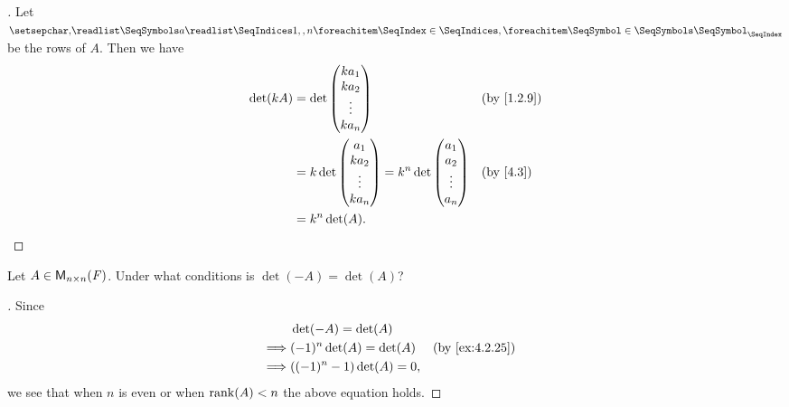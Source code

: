 \begin{proof}[]
  Let \(\seq{a}{1,,n}\) be the rows of \(A\).
  Then we have
  \begin{align*}
    \det(kA) & = \det\begin{pmatrix}
                       k a_1  \\
                       k a_2  \\
                       \vdots \\
                       k a_n
                     \end{pmatrix}                   &  & \text{(by \cref{1.2.9})}       \\
             & = k \det\begin{pmatrix}
                         a_1    \\
                         k a_2  \\
                         \vdots \\
                         k a_n
                       \end{pmatrix} = k^n \det\begin{pmatrix}
                                                 a_1    \\
                                                 a_2    \\
                                                 \vdots \\
                                                 a_n
                                               \end{pmatrix} &  & \text{(by \cref{4.3})} \\
             & = k^n \det(A).
  \end{align*}
\end{proof}

\begin{ex}\label{ex:4.2.26}
  Let \(A \in \mathsf{M}_{{n} \times n}({\mathit{F}})\).
  Under what conditions is \(\det(-A) = \det(A)\)?
\end{ex}

\begin{proof}[]
  Since
  \begin{align*}
             & \det(-A) = \det(A)                                          \\
    \implies & (-1)^n \det(A) = \det(A)  &  & \text{(by \cref{ex:4.2.25})} \\
    \implies & ((-1)^n - 1) \det(A) = 0,
  \end{align*}
  we see that when \(n\) is even or when \(\rk{A} < n\) the above equation holds.
\end{proof}

